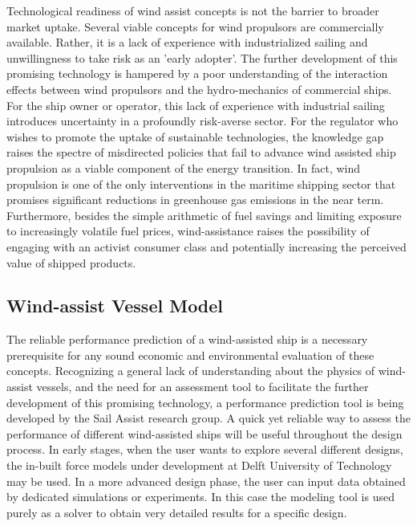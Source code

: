 \documentclass[twoside,twocolumn]{article}
\begin{document}
Technological readiness of wind assist concepts is not the barrier to broader market uptake. Several viable concepts for wind propulsors are commercially available. Rather, it is a lack of experience with industrialized sailing and unwillingness to take risk as an 'early adopter'. The further development of this promising technology is hampered by a poor understanding of  the interaction effects between wind propulsors and the hydro-mechanics of commercial ships. For the ship owner or operator, this lack of experience with industrial sailing introduces uncertainty in a profoundly risk-averse sector. For the regulator who wishes to promote the uptake of sustainable technologies, the knowledge gap raises the spectre of misdirected policies that fail to advance wind assisted ship propulsion as a viable component of the energy transition. In fact, wind propulsion is one of the only interventions in the maritime shipping sector that promises significant reductions in greenhouse gas emissions in the near term. Furthermore, besides the simple arithmetic of fuel savings and limiting exposure to increasingly volatile fuel prices, wind-assistance raises the possibility of engaging with an activist consumer class and potentially increasing the perceived value of shipped products.

\subsection{Wind-assist Vessel Model}
The reliable performance prediction of a wind-assisted ship is a necessary prerequisite for any sound economic and environmental evaluation of these concepts. Recognizing a general lack of understanding about the physics of wind-assist vessels, and the need for an assessment tool to facilitate the further development of this promising technology, a performance prediction tool is being developed by the Sail Assist research group. A quick yet reliable way to assess the performance of different wind-assisted ships will be useful throughout the design process. In early stages, when the user wants to explore several different designs, the in-built force models under development at Delft University of Technology may be used. In a more advanced design phase, the user can input data obtained by dedicated simulations or experiments. In this case the modeling tool is used purely as a solver to obtain very detailed results for a specific design.
\end{document}
